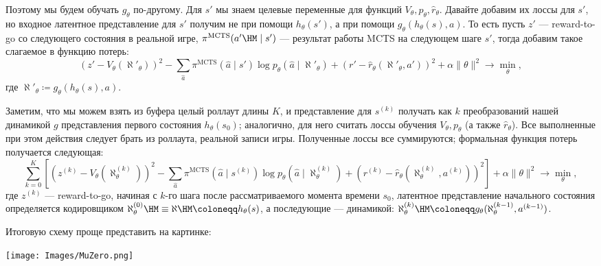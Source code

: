 Поэтому мы будем обучать $g_{\theta}$ по-другому. Для $s'$ мы знаем целевые переменные для функций $V_\theta, p_\theta, \hat{r}_\theta$. Давайте добавим их лоссы для $s'$, но входное латентное представление для $s'$ получим не при помощи $h_{\theta}(s')$, а при помощи $g_{\theta}(h_{\theta}(s), a)$. То есть пусть $z'$ --- reward-to-go со следующего состояния в реальной игре, $\pi^{\mathrm{MCTS}}(a' \HM\mid s')$ --- результат работы MCTS на следующем шаге $s'$, тогда добавим такое слагаемое в функцию потерь:
\begin{equation*}
(z' - V_\theta(\aleph'_{\theta}))^2 - \sum_{\hat{a}} \pi^{\mathrm{MCTS}}(\hat{a} \mid s') \log p_\theta(\hat{a} \mid \aleph'_{\theta}) + \left( r' - \hat{r}_{\theta}(\aleph'_{\theta}, a') \right)^2 + \alpha \| \theta \|^2 \to \min_{\theta},
\end{equation*}
где $\aleph'_{\theta} \coloneqq g_{\theta}(h_{\theta}(s), a)$.

Заметим, что мы можем взять из буфера целый роллаут длины $K$, и представление для $s^{(k)}$ получать как $k$ преобразований нашей динамикой $g$ представления первого состояния $h_{\theta}(s_0)$; аналогично, для него считать лоссы обучения $V_\theta, p_\theta$ (а также $\hat{r}_{\theta}$). Все выполненные при этом действия следует брать из роллаута, реальной записи игры. Полученные лоссы все суммируются; формальная функция потерь получается следующая:
\begin{equation}\label{muzero}
\sum_{k=0}^K \left[ (z^{(k)} - V_\theta(\aleph^{(k)}_{\theta}))^2 - \sum_{\hat{a}} \pi^{\mathrm{MCTS}}(\hat{a} \mid s^{(k)}) \log p_\theta(\hat{a} \mid \aleph^{(k)}_{\theta}) + \left( r^{(k)} - \hat{r}_{\theta}(\aleph^{(k)}_{\theta}, a^{(k)}) \right)^2 \right] + \alpha \| \theta \|^2 \to \min_{\theta},
\end{equation}
где $z^{(k)}$ --- reward-to-go, начиная с $k$-го шага после рассматриваемого момента времени $s_0$, латентное представление начального состояния определяется кодировщиком $\aleph^{(0)}_{\theta} \HM\equiv \aleph \HM\coloneqq h_{\theta}(s)$, а последующие --- динамикой: $\aleph^{(k)}_{\theta} \HM \coloneqq g_{\theta}(\aleph^{(k - 1)}_{\theta}, a^{(k-1)})$.

Итоговую схему проще представить на картинке:
\begin{center}
    \texttt{[image: Images/MuZero.png]}
\end{center}


